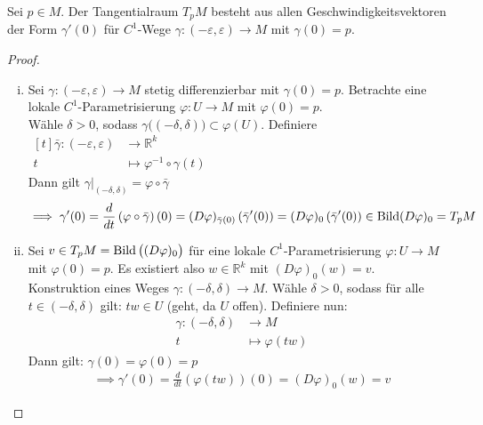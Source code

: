 \documentclass[../main.tex]{subfiles}
\begin{document}
\begin{proposition}
Sei $p \in M$. Der Tangentialraum $T_pM$ besteht aus allen Geschwindigkeitsvektoren der Form
$\gamma ' (0)$ für $C^1$-Wege $\gamma : (-\varepsilon, \varepsilon) \to M$ mit $\gamma (0)=p$.\\
\end{proposition}
\begin{proof}
\begin{enumerate}[(i)]
    \item Sei $\gamma : (-\varepsilon,\varepsilon) \to M$ stetig differenzierbar mit $\gamma(0)=p$. Betrachte eine lokale $C^1$-Parametrisierung $\varphi : U \to M$ mit $\varphi(0)=p$.\\
    Wähle $\delta >0$, sodass $\gamma\big((-\delta,\delta)\big) \subset \varphi (U)$.
    Definiere $\begin{aligned}[t] \bar \gamma : (-\varepsilon, \varepsilon) & \to \mathbb{R}^k \\
    t &\mapsto \varphi^{-1} \circ \gamma(t)
    \end{aligned}$\\
    Dann gilt $\gamma \vert_{(-\delta,\delta)} = \varphi \circ \bar \gamma$ \\
    \begin{align*}
        \implies \gamma'(0) = \frac{d}{dt}\left(\varphi \circ \bar \gamma\right)(0) = (D\varphi)_{\bar \gamma(0)}\left(\bar \gamma'(0)\right) = (D\varphi)_0 \left(\bar \gamma'(0)\right) \in \operatorname{Bild}(D\varphi)_0 = T_pM
    \end{align*}
    \item 
    Sei $v \in T_pM = \operatorname{Bild}\big((D\varphi)_0\big)$ für eine lokale $C^1$-Parametrisierung
    $\varphi : U \to M$ mit $\varphi(0)=p$.
    Es existiert also $w \in \mathbb{R}^k$ mit $(D\varphi)_0(w) =v$. \\
    Konstruktion eines Weges $\gamma : (-\delta, \delta) \to M$.
    Wähle $\delta > 0$, sodass für alle $t \in (-\delta, \delta)$ gilt:
    $tw \in U$ (geht, da $U$ offen). Definiere nun:
    \begin{align*}
        \gamma : (-\delta,\delta) &\to M \\
        t & \mapsto \varphi(tw)
    \end{align*}Dann gilt: $\gamma (0) = \varphi(0)=p$
    \begin{align*}
        \implies \gamma'(0) = \frac{d}{dt}\left(\varphi(tw)\right)(0) = (D\varphi)_0(w) = v
    \end{align*}
\end{enumerate}
\end{proof}
\newpage
\end{document}
